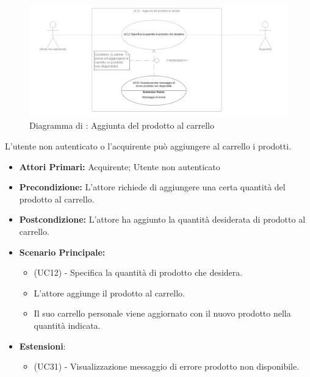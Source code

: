 \begin{figure}[H]
    \centering
    \includegraphics[width=\textwidth]{Immagini/DiagrammiUC/UC11AggiuntaProdottoAlCarrello.png}
    \caption{Diagramma di \actualUC: Aggiunta del prodotto al carrello} 
    \label{fig:Checkout}
\end{figure}


L'utente non autenticato o l'acquirente può aggiungere al carrello i prodotti.
\begin{itemize}
    \item \textbf{Attori Primari:} Acquirente; Utente non autenticato
    \item \textbf{Precondizione:} L'attore richiede di aggiungere una certa quantità del prodotto al carrello. 
    \item \textbf{Postcondizione:} L'attore ha aggiunto la quantità desiderata di prodotto al carrello.
    \item \textbf{Scenario Principale:} 
    \begin{itemize}
        \item (UC12) - Specifica la quantità di prodotto che desidera.
        \item L'attore aggiunge il prodotto al carrello.
        \item Il suo carrello personale viene aggiornato con il nuovo prodotto nella quantità indicata.
    \end{itemize}
    \item \textbf{Estensioni}:
    \begin{itemize}
        \item (UC31) - Visualizzazione messaggio di errore prodotto non disponibile.
    \end{itemize}
\end{itemize}


